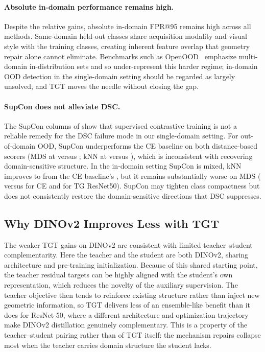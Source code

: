 \paragraph{Absolute in-domain performance remains high.}
Despite the relative gains, absolute in-domain FPR@95 remains high across all methods. Same-domain held-out classes share acquisition modality and visual style with the training classes, creating inherent feature overlap that geometry repair alone cannot eliminate. Benchmarks such as OpenOOD~\citep{yang2022openood} emphasize multi-domain in-distribution sets and so under-represent this harder regime; in-domain OOD detection in the single-domain setting should be regarded as largely unsolved, and TGT moves the needle without closing the gap.

\paragraph{SupCon does not alleviate DSC.}
The SupCon columns of  show that supervised contrastive training is not a reliable remedy for the DSC failure mode in our single-domain setting. For out-of-domain OOD, SupCon underperforms the CE baseline on both distance-based scorers (MDS at  versus ; kNN at  versus ), which is inconsistent with recovering domain-sensitive structure. In the in-domain setting SupCon is mixed, kNN improves to  from the CE baseline's , but it remains substantially worse on MDS ( versus  for CE and  for TG ResNet50). SupCon may tighten class compactness but does not consistently restore the domain-sensitive directions that DSC suppresses.

\subsection{Why DINOv2 Improves Less with TGT}

The weaker TGT gains on DINOv2 are consistent with limited teacher--student complementarity. Here the teacher and the student are both DINOv2, sharing architecture and pre-training initialization. Because of this shared starting point, the teacher residual targets can be highly aligned with the student's own representation, which reduces the novelty of the auxiliary supervision. The teacher objective then tends to reinforce existing structure rather than inject new geometric information, so TGT delivers less of an ensemble-like benefit than it does for ResNet-50, where a different architecture and optimization trajectory make DINOv2 distillation genuinely complementary. This is a property of the teacher--student pairing rather than of TGT itself: the mechanism repairs collapse most when the teacher carries domain structure the student lacks.

